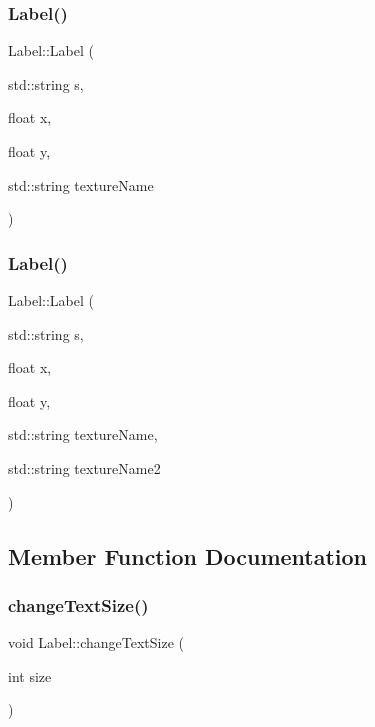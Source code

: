 \mbox{\label{class_label_a3abc88d2408df444dc5f2d39ac2f19a2}} 
\subsubsection{\texorpdfstring{Label()}{Label()}\hspace{0.1cm}{\footnotesize\ttfamily [2/3]}}
{\footnotesize\ttfamily Label\+::\+Label (\begin{DoxyParamCaption}\item[{std\+::string}]{s,  }\item[{float}]{x,  }\item[{float}]{y,  }\item[{std\+::string}]{texture\+Name }\end{DoxyParamCaption})}

\mbox{\label{class_label_a8d503e01b3ab97e9f5bd3cb972c7470e}} 
\subsubsection{\texorpdfstring{Label()}{Label()}\hspace{0.1cm}{\footnotesize\ttfamily [3/3]}}
{\footnotesize\ttfamily Label\+::\+Label (\begin{DoxyParamCaption}\item[{std\+::string}]{s,  }\item[{float}]{x,  }\item[{float}]{y,  }\item[{std\+::string}]{texture\+Name,  }\item[{std\+::string}]{texture\+Name2 }\end{DoxyParamCaption})}



\subsection{Member Function Documentation}
\mbox{\label{class_label_aa3989f512cbeabf9864c090b1d7e0c9b}} 
\subsubsection{\texorpdfstring{changeTextSize()}{changeTextSize()}}
{\footnotesize\ttfamily void Label\+::change\+Text\+Size (\begin{DoxyParamCaption}\item[{int}]{size }\end{DoxyParamCaption})\hspace{0.3cm}{\ttfamily [virtual]}}



